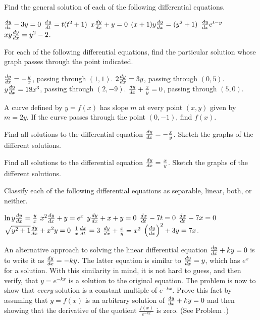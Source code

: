 \begin{exercises}

Find the general solution of each of the
following differential equations.
\begin{exenum}
\x
$\frac{d y}{d x} - 3y = 0$
\x
$\frac{d^{}{y}}{d{t}^{}} = t(t^2 + 1)$
\x
$x\frac{d y}{d x} + y = 0$
\x
$(x+1)y \frac{d y}{d x} = (y^2+1)$
\x
$\frac{d y}{d x} e^{t-y}$
\x
$xy \frac{d y}{d x} = y^2 - 2$.
\end{exenum}

For each of the following differential equations,
find the particular solution whose graph passes
through the point indicated.
\begin{exenum}
\x
$\frac{d y}{d x} = -\frac yx$, passing through $(1,1)$.
\x
$2\frac{d y}{d x} = 3y$, passing through $(0,5)$.
\x
$y\frac{d y}{d x} = 18x^3$, passing through $(2,-9)$.
\x
$\frac{d y}{d x} + \frac xy = 0$, passing through $(5,0)$.
\end{exenum}

A curve defined by $y = f(x)$ has slope $m$
at every point $(x,y)$ given by
$m = 2y$.
If the curve passes through the point
$(0,-1)$, find $f(x)$.

Find all solutions to the differential equation
$\frac{d y}{d x} = -\frac xy$.
Sketch the graphs of the different solutions.

Find all solutions to the differential equation
$\frac{d y}{d x} = \frac xy$.
Sketch the graphs of the different solutions.

Classify each of the following differential equations
as separable, linear, both, or neither.
\begin{exenum}
\x
$\ln y \frac{d y}{d x} = \frac yx$
\x
$x^2 \frac{d y}{d x} + y = e^x$
\x
$y \frac{d y}{d x} + x + y = 0$
\x
$\frac{d^{}{x}}{d{t}^{}} -7t = 0$
\x
$\frac{d^{}{x}}{d{t}^{}} - 7x = 0$
\x
$\sqrt{y^2+1} \frac{d y}{d x} + x^2y = 0$
\x
$\frac1x \frac{d^{}{x}}{d{t}^{}} = 3$
\x
$\frac{d y}{d x} + \frac xy = x^2$
\x
$\left( \frac{d y}{d x} \right)^2 + 3y = 7x$.
\end{exenum}

An alternative approach to solving the linear
differential equation
$\frac{d y}{d x} + ky = 0$ is to write it as
$\frac{d y}{d x} = -ky$.  The latter equation is similar to
$\frac{d y}{d x} = y$, which has $e^x$ for a solution.
With this similarity in mind,
it is not hard to guess, and then verify,
that $y = e^{-kx}$ is a solution to the original equation.
The problem is now to show that \emph{every}
solution is a constant multiple of
$e^{-kx}$.  Prove this fact by assuming that $y = f(x)$
is an arbitrary solution of
$\frac{d y}{d x} + ky = 0$ and then showing that the derivative
of the quotient $\frac{f(x)}{e^{-kx}}$ is zero.
(See Problem .)


\end{exercises}
